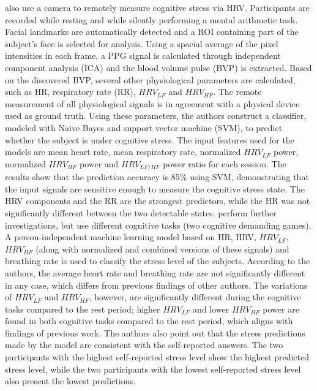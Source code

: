\textcite{mcduff2014remote} also use a camera to remotely measure cognitive stress via HRV. Participants are recorded while resting and while silently performing a mental arithmetic task. Facial landmarks are automatically detected and a ROI containing part of the subject's face is selected for analysis. Using a spacial average of the pixel intensities in each frame, a PPG signal is calculated through independent component analysis (ICA) and the blood volume pulse (BVP) is extracted. Based on the discovered BVP, several other physiological parameters are calculated, such as HR, respiratory rate (RR), $HRV_{LF}$ and $HRV_{HF}$. The remote measurement of all physiological signals is in agreement with a physical device used as ground truth. Using these parameters, the authors construct a classifier, modeled with Naive Bayes and support vector machine (SVM), to predict whether the subject is under cognitive stress. The input features used for the models are mean heart rate, mean respiratory rate, normalized $HRV_{LF}$ power, normalized $HRV_{HF}$ power and $HRV_{LF/HF}$ power ratio for each session. The results show that the prediction accuracy is 85\% using SVM, demonstrating that the input signals are sensitive enough to measure the cognitive stress state. The HRV components and the RR are the strongest predictors, while the HR was not significantly different between the two detectable states. \textcite{mcduffcogcam} perform further investigations, but use different cognitive tasks (two cognitive demanding games). A person-independent machine learning model based on HR, HRV, $HRV_{LF}$, $HRV_{HF}$ (along with normalized and combined versions of these signals) and breathing rate is used to classify the stress level of the subjects. According to the authors, the average heart rate and breathing rate are not significantly different in any case, which differs from previous findings of other authors. The variations of $HRV_{LF}$ and $HRV_{HF}$, however, are significantly different during the cognitive tasks compared to the rest period; higher $HRV_{LF}$ and lower $HRV_{HF}$ power are found in both cognitive tasks compared to the rest period, which aligns with findings of previous work. The authors also point out that the stress predictions made by the model are consistent with the self-reported answers. The two participants with the highest self-reported stress level show the highest predicted stress level, while the two participants with the lowest self-reported stress level also present the lowest predictions. %

